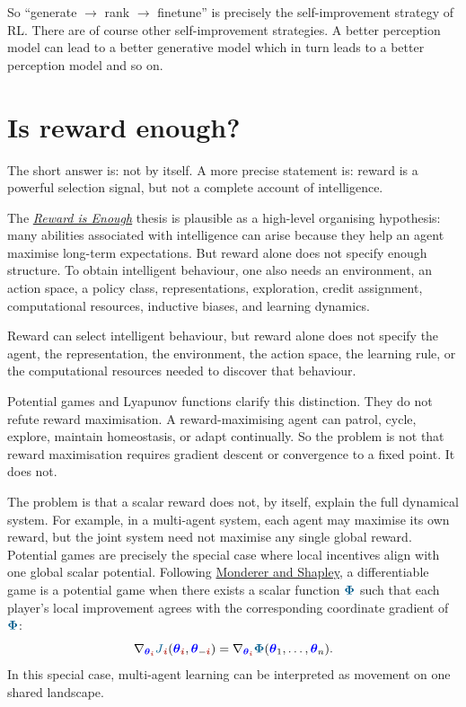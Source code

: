 \documentclass{article}
\newcommand{\colsym}[2]{\ensuremath{\textcolor{#1}{\boldsymbol{#2}}}}
\newcommand{\params}{\colsym{blue}{\theta}}
\newcommand{\perf}{\ensuremath{\textcolor{MidnightBlue}{J}}}
\newcommand{\potential}{\colsym{MidnightBlue}{\Phi}}
\newcommand{\player}{\colsym{BrickRed}{i}}
\begin{document}
So “generate $\rightarrow$ rank $\rightarrow$ finetune” is precisely the self-improvement strategy of RL. There are of course other self-improvement strategies. A better perception model can lead to a better generative model which in turn leads to a better perception model and so on.







\section{Is reward enough?}

The short answer is: not by itself. A more precise statement is: reward is a powerful selection signal, but not a complete account of intelligence.

The
\href{https://www.sciencedirect.com/science/article/pii/S0004370221000862}{\emph{Reward is Enough}}
thesis is plausible as a high-level organising hypothesis: many abilities associated with intelligence can arise because they help an agent maximise long-term expectations. But reward alone does not specify enough structure. To obtain intelligent behaviour, one also needs an environment, an action space, a policy class, representations, exploration, credit assignment, computational resources, inductive biases, and learning dynamics.

Reward can select intelligent behaviour, but reward alone does not specify the agent, the representation, the environment, the action space, the learning rule, or the computational resources needed to discover that behaviour.

Potential games and Lyapunov functions clarify this distinction. They do not refute reward maximisation. A reward-maximising agent can patrol, cycle, explore, maintain homeostasis, or adapt continually. So the problem is not that reward maximisation requires gradient descent or convergence to a fixed point. It does not.

The problem is that a scalar reward does not, by itself, explain the full dynamical system. For example, in a multi-agent system, each agent may maximise its own reward, but the joint system need not maximise any single global reward. Potential games are precisely the special case where local incentives align with one global scalar potential. Following
\href{https://doi.org/10.1006/game.1996.0044}{Monderer and Shapley},
a differentiable game is a potential game when there exists a scalar function \potential{} such that each player's local improvement agrees with the corresponding coordinate gradient of \potential:
\[
\nabla_{\params_{\player}}
\perf_{\player}(\params_{\player},\params_{-\player})
=
\nabla_{\params_{\player}}
\potential(\params_1,\ldots,\params_n).
\]
In this special case, multi-agent learning can be interpreted as movement on one shared landscape.
\end{document}
